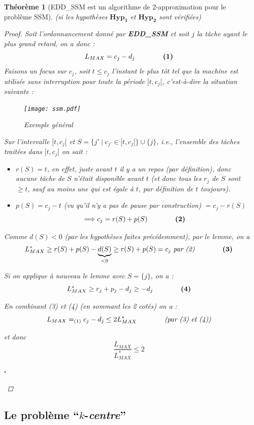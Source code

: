 \documentclass[12pt]{article}
\newcommand{\cqfd}{\begin{flushright}$\square$\end{flushright}}
\newtheorem{thm}{Th\'eor\`eme}[section]
\newtheorem{proof}{Preuve}[section]
\begin{document}
\begin{thm}[EDD\_SSM est un algorithme de 2-approximation pour le problème SSM]
(si les hypothèses $\mathbf{Hyp_1}$ et $\mathbf{Hyp_2}$ sont vérifiées)
\begin{proof}
Soit l'ordonnancement donné par \textbf{EDD\_SSM} et soit $j$ la tâche ayant le
plus grand retard, on a donc : $$L_{MAX} = c_j - d_j\qquad\qquad
\text{\textbf{(1)}}$$ Faisons un focus sur $c_j$, soit $t \leq c_j$ l'instant le
plus tôt tel que la machine est utilisée sans interruption pour toute la
période $[t,c_j[$, c'est-à-dire la situation suivante :

\begin{figure}[H]
    \begin{center}
    \texttt{[image: ssm.pdf]}
    \caption{Exemple général}
    \end{center}
\end{figure}

\noindent Sur l'intervalle $[t,c_j[$ et $S = \{j' \; | \; c_{j'} \in [t, c_j[ \} \cup \{j\}$, i.e., l'ensemble des tâches traitées dans $[t, c_j[$ on sait :
\begin{itemize}
\item[$\bigstar$] $r(S) = t$, en effet, juste avant $t$ il y a un repos
(par définition), donc aucune tâche de $S$ n'était disponible avant $t$ (et donc
tous les $r_j$ de $S$ sont $\geq t$, sauf au moins une qui est égale à $t$, par
définition de $t$ toujours).
\item[$\bigstar$] $p(S) = c_j - t$ (vu qu'il n'y a pas de pause par
construction) $= c_j - r(S)$
$$\Longrightarrow c_j = r(S)+p(S) \qquad\qquad \text{\textbf{(2)}}$$
\end{itemize}
Comme $d(S) < 0$ \textit{(par les hypothèses faites précédemment)}, par le
lemme, on a $$L^*_{MAX} \geq r(S) + p(S) - \underbrace{d(S)}_{<0} \geq r(S)+p(S) = c_j\
\text{\textit{par (2)}}\qquad\qquad \text{\textbf{(3)}}$$

Si on applique à nouveau le lemme avec $S = \{j\}$, on a :
$$L^*_{MAX} \geq r_j + p_j - d_j \geq -d_j\qquad\qquad \text{\textbf{(4)}}$$

En combinant (3) et (4) (en sommant les 2 cotés) on a :
$$L_{MAX} =_{(1)} c_j - d_j \leq 2L^*_{MAX}\qquad\qquad
\text{\textit{(par (3) et (4))}}$$

et donc $$\frac{L_{MAX}}{L^*_{MAX}} \leq 2$$
\cqfd
\end{proof}
\end{thm}

\subsection{Le problème ``$k$-\textit{centre}''}
\end{document}
